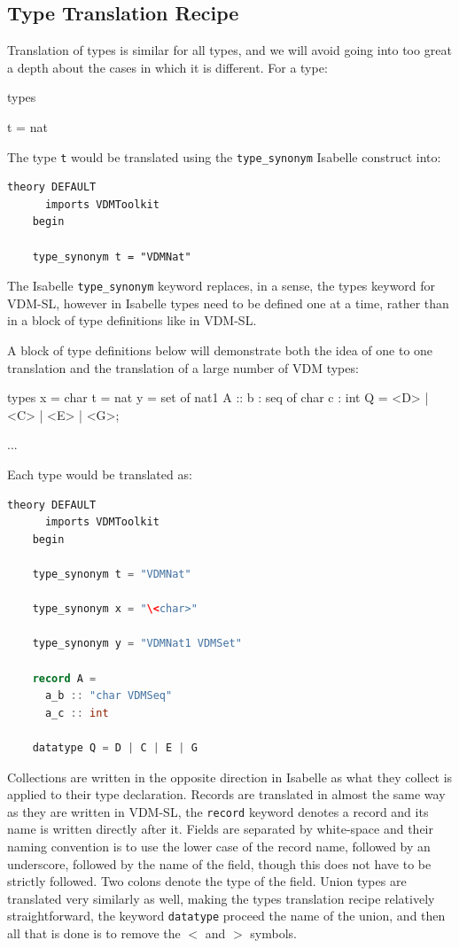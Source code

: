	\subsection{Type Translation Recipe}
	Translation of types is similar for all types, and we will avoid going into too great a depth about the cases in which it is different. For a type:
	\begin{vdmsl}
	types

	t = nat
	\end{vdmsl} 

	The type \lstinline[language=Isabelle]{t} would be translated using the \lstinline[language=Isabelle]{type_synonym} Isabelle construct into:

	\begin{lstlisting}[language=Isabelle]
	theory DEFAULT
	  imports VDMToolkit
	begin

	type_synonym t = "VDMNat"

	\end{lstlisting}

	The Isabelle \lstinline[language=Isabelle]{type_synonym} keyword replaces, in a sense, the types keyword for VDM-SL, however in Isabelle types need to be defined one at a time, rather than in a block of type definitions like in VDM-SL.

	A block of type definitions below will demonstrate both the idea of one to one translation and the translation of a large number of VDM types:
	\begin{vdmsl}
	types
	x = char
	t = nat
	y = set of nat1
	A :: b : seq of char
         c : int
    Q = <D> | <C> | <E> | <G>;

	...
	\end{vdmsl}
	Each type would be translated as:
	\begin{lstlisting}[language=Java]
	theory DEFAULT
	  imports VDMToolkit
	begin

	type_synonym t = "VDMNat"

	type_synonym x = "\<char>"

	type_synonym y = "VDMNat1 VDMSet"

	record A =
	  a_b :: "char VDMSeq"  
	  a_c :: int

	datatype Q = D | C | E | G
	\end{lstlisting}
	Collections are written in the opposite direction in Isabelle as what they collect is applied to their type declaration. Records are translated in almost the same way as they are written in VDM-SL, the \lstinline[language=Isabelle]{record} keyword denotes a record and its name is written directly after it. Fields are separated by white-space and their naming convention is to use the lower case of the record name, followed by an underscore, followed by the name of the field, though this does not have to be strictly followed. Two colons denote the type of the field. Union types are translated very similarly as well, making the types translation recipe relatively straightforward, the keyword \lstinline[language=Isabelle]{datatype} proceed the name of the union, and then all that is done is to remove the $<$ and $>$ symbols.

